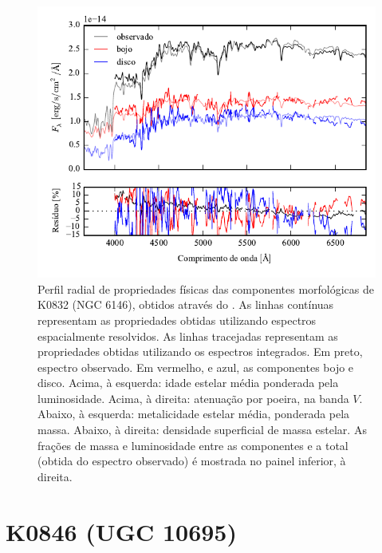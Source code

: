 \begin{figure}
	\includegraphics[page=10]{figuras/sample006a_synthesis}
	\caption[Propriedades físicas das componentes morfológicas de K0832 (NGC 6146)]
	{Perfil radial de propriedades físicas das componentes morfológicas de
	K0832 (NGC 6146), obtidos através do \starlight. As linhas contínuas
	representam as propriedades obtidas utilizando espectros espacialmente
	resolvidos. As linhas tracejadas representam as propriedades obtidas utilizando
	os espectros integrados. Em preto, espectro observado. Em vermelho, e azul, as
	componentes bojo e disco. Acima, à esquerda: idade estelar média ponderada pela
	luminosidade. Acima, à direita: atenuação por poeira, na banda $V$. Abaixo, à
	esquerda: metalicidade estelar média, ponderada pela massa. Abaixo, à direita:
	densidade superficial de massa estelar. As frações de massa e luminosidade
	entre as componentes e a total (obtida do espectro observado) é mostrada no
	painel inferior, à direita.}
	\label{fig:decompSinteseRadprof:K0832}
\end{figure}

\FloatBarrier


\section{K0846 (UGC 10695)}
\label{apendice:Decomp:K0846}

